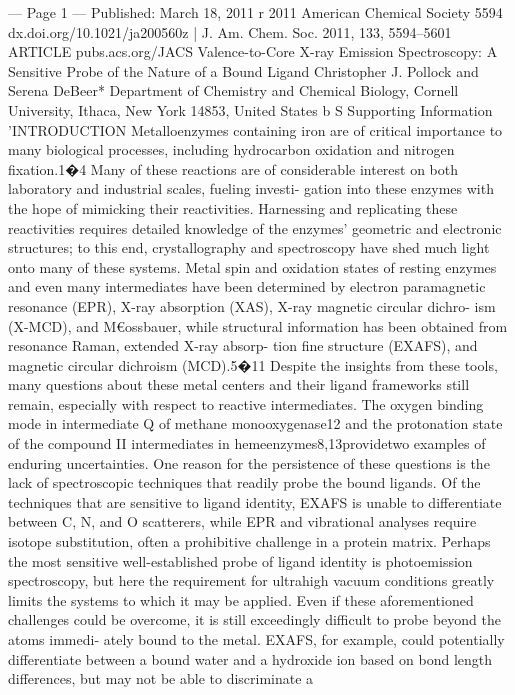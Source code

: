 --- Page 1 ---
Published:
March 18, 2011
r 2011 American Chemical Society
5594
dx.doi.org/10.1021/ja200560z | J. Am. Chem. Soc. 2011, 133, 5594–5601
ARTICLE
pubs.acs.org/JACS
Valence-to-Core X-ray Emission Spectroscopy: A Sensitive Probe of
the Nature of a Bound Ligand
Christopher J. Pollock and Serena DeBeer*
Department of Chemistry and Chemical Biology, Cornell University, Ithaca, New York 14853, United States
b
S Supporting Information
’INTRODUCTION
Metalloenzymes containing iron are of critical importance to
many biological processes, including hydrocarbon oxidation and
nitrogen ﬁxation.1�4 Many of these reactions are of considerable
interest on both laboratory and industrial scales, fueling investi-
gation into these enzymes with the hope of mimicking their
reactivities. Harnessing and replicating these reactivities requires
detailed knowledge of the enzymes’ geometric and electronic
structures; to this end, crystallography and spectroscopy have
shed much light onto many of these systems. Metal spin and
oxidation states of resting enzymes and even many intermediates
have been determined by electron paramagnetic resonance
(EPR), X-ray absorption (XAS), X-ray magnetic circular dichro-
ism (X-MCD), and M€ossbauer, while structural information has
been obtained from resonance Raman, extended X-ray absorp-
tion ﬁne structure (EXAFS), and magnetic circular dichroism
(MCD).5�11
Despite the insights from these tools, many questions about
these metal centers and their ligand frameworks still remain,
especially with respect to reactive intermediates. The oxygen
binding mode in intermediate Q of methane monooxygenase12
and the protonation state of the compound II intermediates in
hemeenzymes8,13providetwo examples of enduring uncertainties.
One reason for the persistence of these questions is the lack of
spectroscopic techniques that readily probe the bound ligands.
Of the techniques that are sensitive to ligand identity, EXAFS
is unable to diﬀerentiate between C, N, and O scatterers, while
EPR and vibrational analyses require isotope substitution, often a
prohibitive challenge in a protein matrix. Perhaps the most
sensitive well-established probe of ligand identity is photoemission
spectroscopy, but here the requirement for ultrahigh vacuum
conditions greatly limits the systems to which it may be applied.
Even if these aforementioned challenges could be overcome, it
is still exceedingly diﬃcult to probe beyond the atoms immedi-
ately bound to the metal. EXAFS, for example, could potentially
diﬀerentiate between a bound water and a hydroxide ion based
on bond length diﬀerences, but may not be able to discriminate a
